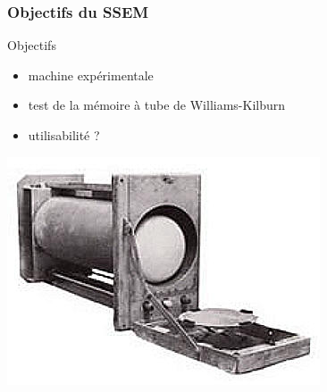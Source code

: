 \documentclass{beamer}
\begin{document}
\begin{frame}

\frametitle{Objectifs du SSEM}

\begin{multicols}{2}
\alert{Objectifs}
\begin{itemize}
\item machine \alert{expérimentale}
\item test de la  mémoire à \alert{tube de Williams-Kilburn}
\item \alert{utilisabilité ?}
\end{itemize}

\includegraphics[width=\linewidth]{Historique/william-kilburn_tube.jpg}

\end{multicols}
\end{frame}
\end{document}
